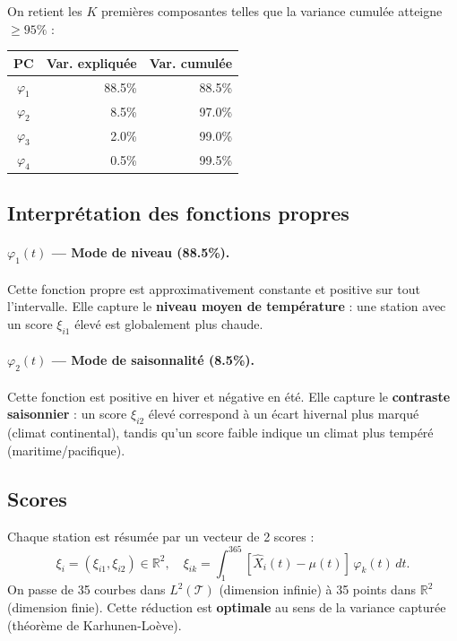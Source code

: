 \documentclass[11pt, a4paper]{article}
\newcommand{\R}{\mathbb{R}}
\newcommand{\Ltwo}{L^2(\mathcal{T})}
\theoremstyle{definition}
\theoremstyle{remark}
\begin{document}
On retient les $K$ premières composantes telles que la variance cumulée atteigne
$\geq 95\%$ :

\begin{center}
\begin{tabular}{crr}
  \toprule
  \textbf{PC} & \textbf{Var. expliquée} & \textbf{Var. cumulée} \\
  \midrule
  $\varphi_1$ & 88.5\% & 88.5\% \\
  $\varphi_2$ &  8.5\% & 97.0\% \\
  $\varphi_3$ &  2.0\% & 99.0\% \\
  $\varphi_4$ &  0.5\% & 99.5\% \\
  \bottomrule
\end{tabular}
\end{center}

\begin{center}
\end{center}

\subsection{Interprétation des fonctions propres}

\paragraph{$\varphi_1(t)$ — Mode de niveau (88.5\%).}
Cette fonction propre est approximativement constante et positive sur tout
l'intervalle. Elle capture le \textbf{niveau moyen de température} : une station
avec un score $\xi_{i1}$ élevé est globalement plus chaude.

\paragraph{$\varphi_2(t)$ — Mode de saisonnalité (8.5\%).}
Cette fonction est positive en hiver et négative en été. Elle capture le
\textbf{contraste saisonnier} : un score $\xi_{i2}$ élevé correspond à un
écart hivernal plus marqué (climat continental), tandis qu'un score faible
indique un climat plus tempéré (maritime/pacifique).

\subsection{Scores}

Chaque station est résumée par un vecteur de 2 scores :
\[
  \xi_i = (\xi_{i1}, \xi_{i2}) \in \R^2, \quad
  \xi_{ik} = \int_1^{365} [\hat{X}_i(t) - \mu(t)] \, \varphi_k(t) \, dt.
\]
On passe de 35 courbes dans $\Ltwo$ (dimension infinie) à 35 points dans
$\R^2$ (dimension finie). Cette réduction est \textbf{optimale} au sens de la
variance capturée (théorème de Karhunen-Loève).
\end{document}
